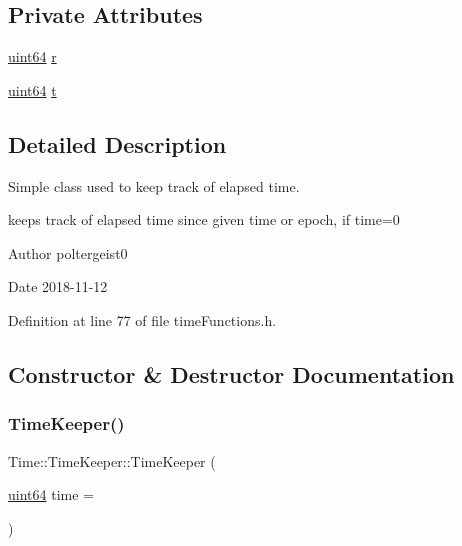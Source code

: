 \subsection*{Private Attributes}
\begin{DoxyCompactItemize}
\item 
\hyperlink{systemDefines_8h_abc0f5bc07737e498f287334775dff2b6}{uint64} \hyperlink{classTime_1_1TimeKeeper_ac464f5009a83136c7b864abf8aff0951}{r}
\item 
\hyperlink{systemDefines_8h_abc0f5bc07737e498f287334775dff2b6}{uint64} \hyperlink{classTime_1_1TimeKeeper_abc07fe9dfb0c61ed901eef1bbf4a994b}{t}
\end{DoxyCompactItemize}


\subsection{Detailed Description}
Simple class used to keep track of elapsed time. 

keeps track of elapsed time since given time or epoch, if time=0

\begin{DoxyAuthor}{Author}
poltergeist0
\end{DoxyAuthor}
\begin{DoxyDate}{Date}
2018-\/11-\/12 
\end{DoxyDate}


Definition at line 77 of file time\+Functions.\+h.



\subsection{Constructor \& Destructor Documentation}
\mbox{\label{classTime_1_1TimeKeeper_a578a506c1bf462e199a259442380a16c}} 
\subsubsection{\texorpdfstring{Time\+Keeper()}{TimeKeeper()}}
{\footnotesize\ttfamily Time\+::\+Time\+Keeper\+::\+Time\+Keeper (\begin{DoxyParamCaption}\item[{\hyperlink{systemDefines_8h_abc0f5bc07737e498f287334775dff2b6}{uint64}}]{time = {} }\end{DoxyParamCaption})\hspace{0.3cm}{\ttfamily [inline]}}



